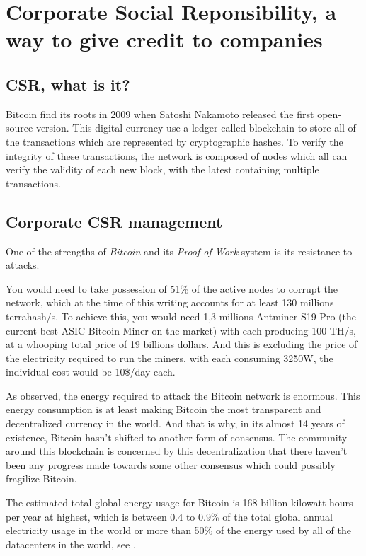 \documentclass{ifacconf}
\begin{document}
\section{Corporate Social Reponsibility, a way to give credit to companies}


\subsection{CSR, what is it?}

Bitcoin find its roots in 2009 when Satoshi Nakamoto released the first open-source version. This digital currency use a ledger called blockchain to store all of the transactions which are represented by cryptographic hashes. To verify the integrity of these transactions, the network is composed of nodes which all can verify the validity of each new block, with the latest containing multiple transactions.

\subsection{Corporate CSR management}

One of the strengths of \textit{Bitcoin} and its \textit{Proof-of-Work} system is its resistance to attacks. 
\begin{pf}  
You would need to take possession of 51\% of the active nodes to corrupt the network, which at the time of this writing accounts for at least 130 millions terrahash/s. To achieve this, you would need 1,3 millions Antminer S19 Pro (the current best ASIC Bitcoin Miner on the market) with each producing 100 TH/s, at a whooping total price of 19 billions dollars. And this is excluding the price of the electricity required to run the miners, with each consuming 3250W, the individual cost would be 10\$/day each.
\end{pf}

As observed, the energy required to attack the Bitcoin network is enormous.
This energy consumption is at least making Bitcoin the most transparent and decentralized currency in the world. And that is why, in its almost 14 years of existence, Bitcoin hasn't shifted to another form of consensus. The community around this blockchain is concerned by this decentralization that there haven't been any progress made towards some other consensus which could possibly fragilize Bitcoin.

 The estimated total global energy usage for Bitcoin is 168 billion kilowatt-hours per year at highest, which is between 0.4 to 0.9\% of the total global annual electricity usage in the world or more than 50\% of the energy used by all of the datacenters in the world, see \cite{TowGreen:21}.
\end{document}
